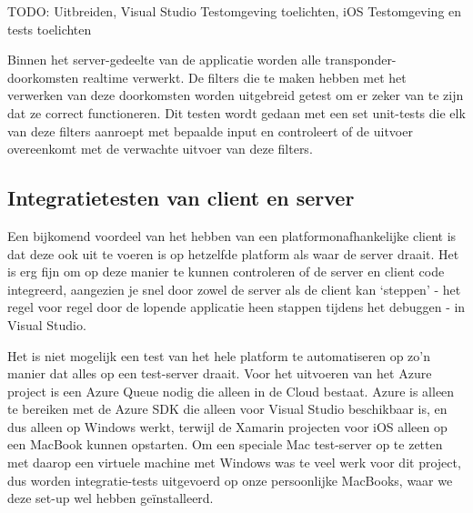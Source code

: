 {\par \bigskip \par \color{red} TODO: Uitbreiden, Visual Studio Testomgeving toelichten, iOS Testomgeving en tests toelichten \par \bigskip \par }

Binnen het server-gedeelte van de applicatie worden alle transponder-doorkomsten realtime verwerkt. De filters die te maken hebben met het verwerken van deze doorkomsten worden uitgebreid getest om er zeker van te zijn dat ze correct functioneren. Dit testen wordt gedaan met een set unit-tests die elk van deze filters aanroept met bepaalde input en controleert of de uitvoer overeenkomt met de verwachte uitvoer van deze filters.

\subsection{Integratietesten van client en server}
Een bijkomend voordeel van het hebben van een platformonafhankelijke client is dat deze ook uit te voeren is op hetzelfde platform als waar de server draait. Het is erg fijn om op deze manier te kunnen controleren of de server en client code integreerd, aangezien je snel door zowel de server als de client kan `steppen' - het regel voor regel door de lopende applicatie heen stappen tijdens het debuggen - in Visual Studio.

Het is niet mogelijk een test van het hele platform te automatiseren op zo'n manier dat alles op een test-server draait. Voor het uitvoeren van het Azure project is een Azure Queue nodig die alleen in de Cloud bestaat. Azure is alleen te bereiken met de Azure SDK die alleen voor Visual Studio beschikbaar is, en dus alleen op Windows werkt, terwijl de Xamarin projecten voor iOS alleen op een MacBook kunnen opstarten. Om een speciale Mac test-server op te zetten met daarop een virtuele machine met Windows was te veel werk voor dit project, dus worden integratie-tests uitgevoerd op onze persoonlijke MacBooks, waar we deze set-up wel hebben geïnstalleerd.

